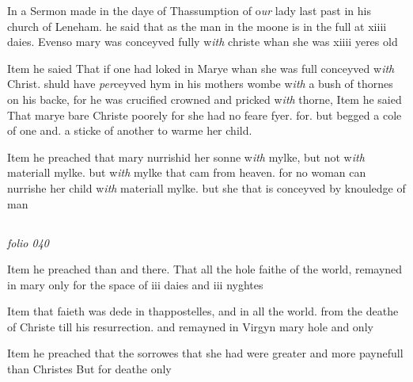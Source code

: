 \documentclass[12pt, a4paper]{book}
\begin{document}
		\ifthenelse{\isodd{\thepage}}
		{\reversemarginpar}
		{\normalmarginpar}
		In a Sermon made in the daye of Thassumption
 	of o\textit{ur} lady last past in his church of Leneham.
 he said that as the man in the moone is in the
 full at xiiii daies. Evenso mary was conceyved
 fully w\textit{ith }christe whan she was xiiii yeres old

		\ifthenelse{\isodd{\thepage}}
		{\reversemarginpar}
		{\normalmarginpar}
		 Item he saied That if one had loked in Marye
 whan she was full conceyved w\textit{ith} Christ. shuld
 have \textit{per}ceyved hym in his mothers wombe w\textit{ith} a bush
 of thornes on his backe, for he was crucified
 crowned and pricked w\textit{ith} thorne,
 Item he saied That marye bare Christe poorely
 for she had no feare fyer. for. but begged a
 cole of one and. a sticke of another to warme
 her child.
	
				\marginpar[\vspace{0.5cm}{\textcolor{Gray}{herecie}}]{}
			
		\ifthenelse{\isodd{\thepage}}
		{\reversemarginpar}
		{\normalmarginpar}
		Item he preached that mary nurrishid her sonne
 w\textit{ith} mylke, but not w\textit{ith} materiall mylke. but w\textit{ith}
 mylke that cam from heaven. for no woman can
 nurrishe her child w\textit{ith} materiall mylke. but she that
 is conceyved by knouledge of man


\dotfill
						\newpage {} \subsection*{}

\textit{folio 040}


	
		
		\ifthenelse{\isodd{\thepage}}
		{\reversemarginpar}
		{\normalmarginpar}
		Item he preached than and there. That all the hole faithe of
			the world, remayned in mary only for the space of iii daies and iii
			nyghtes
	
	
		
		\ifthenelse{\isodd{\thepage}}
		{\reversemarginpar}
		{\normalmarginpar}
		Item that faieth was dede in thappostelles, and in all the
			world. from the deathe of Christe till his resurrection. and remayned in
			Virgyn mary hole and only
	
	
		
		\ifthenelse{\isodd{\thepage}}
		{\reversemarginpar}
		{\normalmarginpar}
		Item he preached that the sorrowes that she had were greater
			and more paynefull than Christes But for deathe only
	
\end{document}
